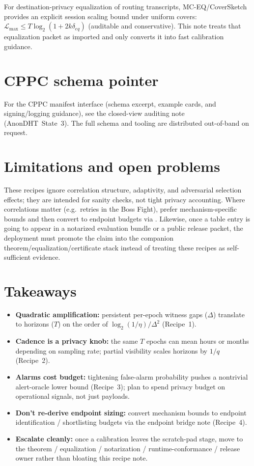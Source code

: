 \documentclass[11pt]{article}
\begin{document}
For destination-privacy equalization of routing transcripts, MC-EQ/CoverSketch provides an explicit session scaling bound under uniform covers: $\mathcal{L}_{\max}\le T\log_2(1+2k\delta_{eq})$ (auditable and conservative). This note treats that equalization packet as imported and only converts it into fast calibration guidance.\cite{series:mceq}

\section{CPPC schema pointer}
For the CPPC manifest interface (schema excerpt, example cards, and signing/logging guidance), see the closed-view auditing note (AnonDHT~State~3).\cite{state3} The full schema and tooling are distributed out-of-band on request.\cite{series:artifactpolicy}

\section{Limitations and open problems}
These recipes ignore correlation structure, adaptivity, and adversarial selection effects; they are intended for sanity checks, not tight privacy accounting.
Where correlations matter (e.g.\ retries in the Boss Fight), prefer mechanism-specific bounds and then convert to endpoint budgets via \cite{synth5}.
Likewise, once a table entry is going to appear in a notarized evaluation bundle or a public release packet, the deployment must promote the claim into the companion theorem/equalization/certificate stack instead of treating these recipes as self-sufficient evidence.\cite{state1,state2,series:mceq,series:eval1,series:opB,series:abom,series:releaseproperty}

\section{Takeaways}
\begin{itemize}[leftmargin=*]
\item \textbf{Quadratic amplification:} persistent per-epoch witness gaps ($\Delta$) translate to horizons ($T$) on the order of $\log_2(1/\eta)/\Delta^2$ (Recipe~1).
\item \textbf{Cadence is a privacy knob:} the same $T$ epochs can mean hours or months depending on sampling rate; partial visibility scales horizons by $1/q$ (Recipe~2).
\item \textbf{Alarms cost budget:} tightening false-alarm probability pushes a nontrivial alert-oracle lower bound (Recipe~3); plan to spend privacy budget on operational signals, not just payloads.
\item \textbf{Don't re-derive endpoint sizing:} convert mechanism bounds to endpoint identification / shortlisting budgets via the endpoint bridge note (Recipe~4).
\item \textbf{Escalate cleanly:} once a calibration leaves the scratch-pad stage, move to the theorem / equalization / notarization / runtime-conformance / release owner rather than bloating this recipe note.\cite{state1,state2,state3,series:mceq,series:eval1,series:opB,series:abom,series:releaseproperty}
\end{itemize}
\end{document}
